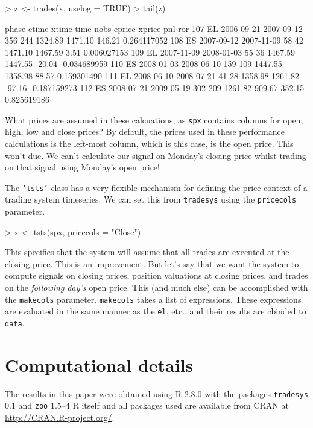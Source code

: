 \documentclass[a4]{article}
\newcommand{\code}[1]{\texttt{#1}}
\begin{document}
\begin{Schunk}
\begin{Sinput}
> z <- trades(x, uselog = TRUE)
> tail(z)
\end{Sinput}
\begin{Soutput}
    phase      etime      xtime time nobs  eprice  xprice    pnl          ror
107    EL 2006-09-21 2007-09-12  356  244 1324.89 1471.10 146.21  0.264117052
108    ES 2007-09-12 2007-11-09   58   42 1471.10 1467.59   3.51  0.006027153
109    EL 2007-11-09 2008-01-03   55   36 1467.59 1447.55 -20.04 -0.034689959
110    ES 2008-01-03 2008-06-10  159  109 1447.55 1358.98  88.57  0.159301490
111    EL 2008-06-10 2008-07-21   41   28 1358.98 1261.82 -97.16 -0.187159273
112    ES 2008-07-21 2009-05-19  302  209 1261.82  909.67 352.15  0.825619186
\end{Soutput}
\end{Schunk}
What prices are assumed in these calcuations, as \code{spx} contains
columns for open, high, low and close prices? By default, the prices
used in these performance calculations is the left-most column, which
is this case, is the open price. This won't due. We can't calculate
our signal on Monday's closing price whilst trading on that signal
using Monday's open price! 

The \code{'tsts'} class has a very flexible mechanism for defining the
price context of a trading system timeseries. We can set this from
\code{tradesys} using the \code{pricecols} parameter.
\begin{Schunk}
\begin{Sinput}
> x <- tsts(spx, pricecols = "Close")
\end{Sinput}
\end{Schunk}

This specifies that the system will assume that all trades are
executed at the closing price. This is an improvement. But let's say
that we want the system to compute signals on closing prices, position
valuations at closing prices, and trades on the \emph{following day's}
open price. This (and much else) can be accomplished with the
\code{makecols} parameter.
\code{makecols} takes a list of expressions. These expressions are
evaluated in the same manner as the \code{el}, etc., and their results
are cbinded to \code{data}. 

\section*{Computational details}
The results in this paper were obtained using R
2.8.0 with the packages
\code{tradesys} 0.1 
and \code{zoo}  1.5--4 R itself
and all packages used are available from CRAN at
\url{http://CRAN.R-project.org/}.
\end{document}
